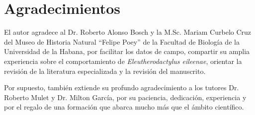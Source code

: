 \chapter*{Agradecimientos}\label{chapter:agradecimientos}


El autor agradece al Dr. Roberto Alonso 
Bosch y la M.Sc. Mariam Curbelo Cruz del Museo de Historia 
Natural “Felipe Poey” de la Facultad de Biología de la 
Universidad de la Habana, por facilitar los datos de 
campo, 
compartir su amplia experiencia sobre el 
comportamiento de \emph{Eleutherodactylus 
eileenae}, orientar la revisión de la 
literatura especializada y la revisión del manuscrito.

Por supuesto, también extiende su profundo agradecimiento a los 
tutores Dr. Roberto Mulet y Dr. Milton
García, por su paciencia, dedicación, experiencia y por el regalo 
de una formación que abarca mucho más que el ámbito científico.  
